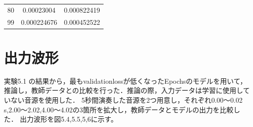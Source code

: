 \documentclass{jreport}		%
\begin{document}
\begin{table}
\begin{center}
\begin{tabular}{c|cc}
80&0.00023004&0.000822419 \\
99&0.000224676&0.000452522 \\ \hline
  \end{tabular}
  \end{center}
\end{table}

\section{出力波形}
実験5.1 の結果から，最もvalidationlossが低くなったEpochsのモデルを用いて，推論し，教師データとの比較を行った．推論の際，入力データは学習に使用していない音源を使用した．
5秒間演奏した音源を2つ用意し，それぞれ0.00～0.02 s,2.00～2.02,4.00～4.02の3箇所を拡大し，教師データとモデルの出力を比較した．
出力波形を図5.4,5.5,5,6に示す。
\end{document}
